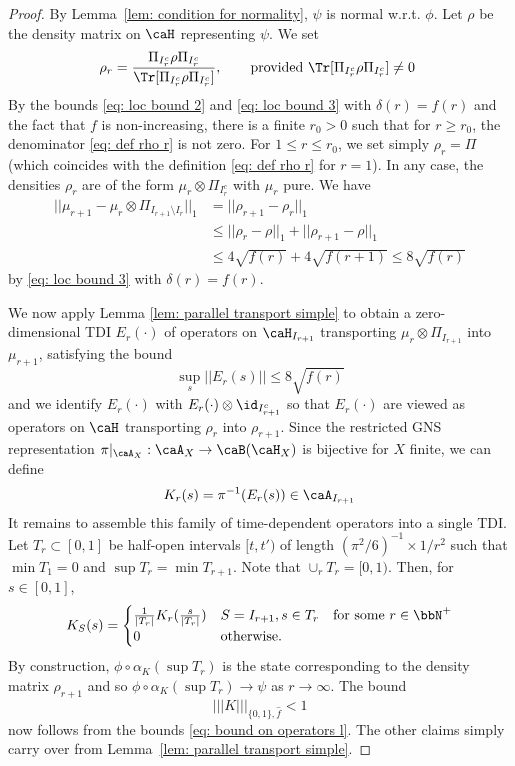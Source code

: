 \begin{proof}
	By Lemma~\ref{lem: condition for normality}, $\psi$ is normal w.r.t. $\phi$. Let $\rho$ be the density matrix on $\caH$ representing $\psi$.
	We set 
	\begin{equation} \label{eq: def rho r}
		\rho_r= \frac{\Pi_{I_{r}^c}\rho \Pi_{I_{r}^c}}{\Tr[\Pi_{I_{r}^c}\rho \Pi_{I_{r}^c}]}, \qquad \text{provided  $\Tr[\Pi_{I_{r}^c}\rho \Pi_{I_{r}^c}] \neq 0$  }  
	\end{equation}  
	By the bounds \eqref{eq: loc bound 2} and \eqref{eq: loc bound 3} with $\delta(r)=f(r)$ and the fact that $f$ is non-increasing, there is a finite $r_0>0$ such that for $r\geq r_0$, the denominator  \eqref{eq: def rho r} is not zero.
	For $1 \leq r\leq r_0$, we set simply $\rho_r=\Pi$ (which coincides with the definition \eqref{eq: def rho r} for $r=1$).  In any case, the densities $\rho_r$ are of the form $\mu_r\otimes \Pi_{I_r^c}$ with $\mu_r$ pure.
	We have
	\begin{align*}
		||\mu_{r+1}-\mu_r\otimes \Pi_{I_{r+1}\setminus I_r}||_1 &= ||\rho_{r+1}-\rho_r||_1 \\
		&\leq ||\rho_r-\rho||_1 +||\rho_{r+1}-\rho||_1 \\
		&\leq  4\sqrt{f(r)}+4\sqrt{f(r+1)} \leq 8\sqrt{f(r)}
	\end{align*}
	by \eqref{eq: loc bound 3} with  $\delta(r)=f(r)$.
	
	We now apply Lemma \ref{lem: parallel transport simple} to obtain a zero-dimensional TDI $E_r(\cdot)$ of operators on $\caH_{I_{r+1}}$ transporting $\mu_r\otimes \Pi_{I_{r+1}}$ into  $\mu_{r+1}$, satisfying the bound 
	\begin{equation}\label{eq: bound on operators l}
		\sup_{s}||E_r(s)|| \leq 8 \sqrt{f(r)}
	\end{equation}
	and we identify $E_r(\cdot)$ with $E_r(\cdot)\otimes \id_{I_{r+1}^c}$ so that $E_r(\cdot)$ are viewed as operators on $\caH$ transporting $\rho_r$ into $\rho_{r+1}$. Since the restricted GNS representation $\pi|_{\caA_X}:\caA_X\to \caB(\caH_X)$ is bijective for $X$ finite, we can define
	$$
	K_r(s)=\pi^{-1}(E_r(s))  \in \caA_{I_{r+1}}
	$$
	It remains to assemble this family of time-dependent operators into a single TDI.
	Let $T_r \subset [0,1]$ be half-open intervals $[t,t')$ of length $(\pi^2/6)^{-1} \times 1/r^2$ such that $\min T_1=0$ and $\sup T_{r}=\min T_{r+1}$. Note that $\cup_{r} T_r=[0,1)$. Then, for $s\in [0,1]$,
	$$
	K_{S}(s)= \begin{cases}  \frac{1}{|T_r|}  K_r(\frac{s}{|T_r|})   &    S=I_{r+1}, s\in T_r \quad \text{for some $r\in \bbN^+$} \\
		0 & \text{otherwise}. \end{cases}
	$$
	By construction, $\phi\circ\alpha_K(\sup T_r)$ is the state corresponding to the density matrix $\rho_{r+1}$ and so $\phi\circ\alpha_K(\sup T_r)\to \psi$ as $r\to\infty$. The bound $$ |||K|||_{\{0,1\},\hat{f}}<1$$ now follows from the bounds \eqref{eq: bound on operators l}.  The other claims simply carry over from Lemma~\ref{lem: parallel transport simple}. 
\end{proof}






